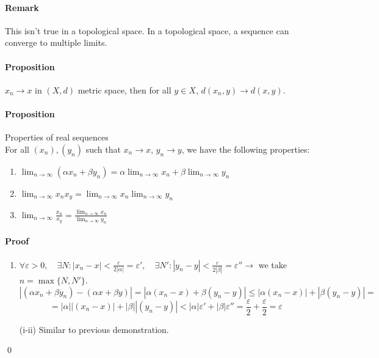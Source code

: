 \documentclass{article}
\newcommand{\abs}[1]{\left|#1\right|}
\newcommand{\limn}{\lim_{n \to \infty}}
\newcommand{\Ep}{\varepsilon}
\newcommand{\Proposition}{\paragraph{Proposition}}
\newcommand{\Remark}{\paragraph{Remark}}
\newcommand{\Proof}{\paragraph{Proof}}
\begin{document}
	\Remark This isn't true in a topological space. In a topological space, a
	sequence can converge to multiple limits.

	\Proposition $x_n \to x$ in $(X,d)$ metric space, then for all $y \in X$,
	$d(x_n,y) \to d(x,y)$.


	\Proposition Properties of real sequences
	\\For all $(x_n), (y_n)$ such that $x_n \to x$, $y_n \to y$, we have the
		following properties:
		\begin{enumerate}[label=(\roman*)]
			\item $ \displaystyle
			\limn (\alpha x_n + \beta y_n) = \alpha \limn x_n + \beta \limn y_n $

			\item $ \displaystyle
			\limn x_n x_y = \limn x_n \limn y_n $

			\item $ \displaystyle
			\limn \frac{x_n}{x_y} = \frac{\limn x_n}{\limn y_n} $
		\end{enumerate}

	\Proof
		\begin{enumerate}[label=(\roman*)]
			\item $ \displaystyle
			\forall \Ep > 0, \quad
			\exists N : \abs{x_n - x} < \frac{\Ep}{2\abs{\alpha}} = \Ep', \quad
			\exists N' : \abs{y_n - y} < \frac{\Ep}{2\abs{\beta}} = \Ep''
			\rightarrow $ we take $ n = \max \{ N, N'\} $.
			\begin{equation*}
				\abs{(\alpha x_n + \beta y_n) - (\alpha x + \beta y)} =
				\abs{\alpha (x_n - x) + \beta (y_n - y)} \leq
				\abs{\alpha (x_n - x)} + \abs{\beta (y_n - y)} =
			\end{equation*}
			\begin{equation*} =
				\abs{\alpha} \abs{(x_n - x)} + \abs{\beta} \abs{(y_n - y)} <
				\abs{\alpha} \Ep' + \abs{\beta} \Ep'' =
				\frac{\Ep}{2} + \frac{\Ep}{2} =
				\Ep
			\end{equation*}

			\item[(i-ii)] Similar to previous demonstration.
		\end{enumerate}
		\qed
\end{document}
